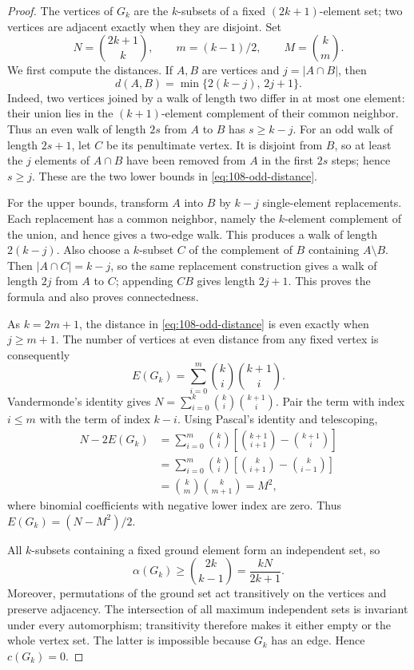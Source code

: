 \documentclass[11pt,a4paper]{article}
\theoremstyle{remark}
\begin{document}
\begin{proof}
The vertices of $G_k$ are the $k$-subsets of a fixed $(2k+1)$-element set;
two vertices are adjacent exactly when they are disjoint.  Set
\[
 N=\binom{2k+1}{k},\qquad m=(k-1)/2,\qquad M=\binom{k}{m}.
\]
We first compute the distances.  If $A,B$ are vertices and
$j=|A\cap B|$, then
\begin{equation}\label{eq:108-odd-distance}
 d(A,B)=\min\{2(k-j),\,2j+1\}.
\end{equation}
Indeed, two vertices joined by a walk of length two differ in at most one
element: their union lies in the $(k+1)$-element complement of their
common neighbor.  Thus an even walk of length $2s$ from $A$ to $B$ has
$s\ge k-j$.  For an odd walk of length $2s+1$, let $C$ be its penultimate
vertex.  It is disjoint from $B$, so at least the $j$ elements of
$A\cap B$ have been removed from $A$ in the first $2s$ steps; hence
$s\ge j$.  These are the two lower bounds in
\eqref{eq:108-odd-distance}.

For the upper bounds, transform $A$ into $B$ by $k-j$ single-element
replacements.  Each replacement has a common neighbor, namely the
$k$-element complement of the union, and hence gives a two-edge walk.
This produces a walk of length $2(k-j)$.  Also choose a $k$-subset $C$
of the complement of $B$ containing $A\setminus B$.  Then
$|A\cap C|=k-j$, so the same replacement construction gives a walk of
length $2j$ from $A$ to $C$; appending $CB$ gives length $2j+1$.
This proves the formula and also proves connectedness.

As $k=2m+1$, the distance in \eqref{eq:108-odd-distance} is even exactly
when $j\ge m+1$.  The number of vertices at even distance from any fixed
vertex is consequently
\[
 E(G_k)=\sum_{i=0}^{m}\binom{k}{i}\binom{k+1}{i}.
\]
Vandermonde's identity gives
$N=\sum_{i=0}^{k}\binom{k}{i}\binom{k+1}{i}$.
Pair the term with index $i\le m$ with the term of index $k-i$.  Using
Pascal's identity and telescoping,
\begin{align*}
 N-2E(G_k)
 &=\sum_{i=0}^{m}\binom{k}{i}
       \left[\binom{k+1}{i+1}-\binom{k+1}{i}\right]\\
 &=\sum_{i=0}^{m}\binom{k}{i}
       \left[\binom{k}{i+1}-\binom{k}{i-1}\right]\\
 &=\binom{k}{m}\binom{k}{m+1}=M^2,
\end{align*}
where binomial coefficients with negative lower index are zero.
Thus $E(G_k)=(N-M^2)/2$.

All $k$-subsets containing a fixed ground element form an independent
set, so
\[
 \alpha(G_k)\ge\binom{2k}{k-1}=\frac{kN}{2k+1}.
\]
Moreover, permutations of the ground set act transitively on the
vertices and preserve adjacency.  The intersection of all maximum
independent sets is invariant under every automorphism; transitivity
therefore makes it either empty or the whole vertex set.  The latter
is impossible because $G_k$ has an edge.  Hence $c(G_k)=0$.


\end{proof}
\end{document}
